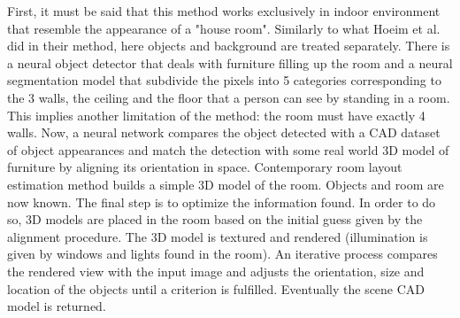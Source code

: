 First, it must be said that this method works exclusively in indoor environment that resemble the appearance of a "house room".
Similarly to what Hoeim et al. did in their method, here objects and background are treated separately.
There is a neural object detector that deals with furniture filling up the room and a neural segmentation model that subdivide the pixels into 5 categories corresponding to the 3 walls, the ceiling and the floor that a person can see by standing in a room.
This implies another limitation of the method: the room must have exactly 4 walls.
Now, a neural network compares the object detected with a CAD dataset of object appearances and match the detection with some real world 3D model of furniture by aligning its orientation in space.
Contemporary room layout estimation method builds a simple 3D model of the room.
Objects and room are now known.
The final step is to optimize the information found.
In order to do so, 3D models are placed in the room based on the initial guess given by the alignment procedure.
The 3D model is textured and rendered (illumination is given by windows and lights found in the room).
An iterative process compares the rendered view with the input image and adjusts the orientation, size and location of the objects until a criterion is fulfilled.
Eventually the scene CAD model is returned.